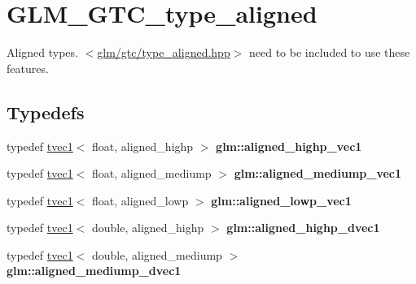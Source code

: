 \hypertarget{group__gtc__type__aligned}{}\section{G\+L\+M\+\_\+\+G\+T\+C\+\_\+type\+\_\+aligned}
\label{group__gtc__type__aligned}


Aligned types. $<$\hyperlink{gtc_2type__aligned_8hpp}{glm/gtc/type\+\_\+aligned.\+hpp}$>$ need to be included to use these features.  


\subsection*{Typedefs}
\begin{DoxyCompactItemize}
\item 
\mbox{\label{group__gtc__type__aligned_ga5d83af334bd222c85f73bf37eecf4768}} 
typedef \hyperlink{structglm_1_1tvec1}{tvec1}$<$ float, aligned\+\_\+highp $>$ {\bfseries glm\+::aligned\+\_\+highp\+\_\+vec1}
\item 
\mbox{\label{group__gtc__type__aligned_ga5fbb1e478f8f47c5809f561368572927}} 
typedef \hyperlink{structglm_1_1tvec1}{tvec1}$<$ float, aligned\+\_\+mediump $>$ {\bfseries glm\+::aligned\+\_\+mediump\+\_\+vec1}
\item 
\mbox{\label{group__gtc__type__aligned_ga9f8de0030682199a8dbef56b0f3fb3ca}} 
typedef \hyperlink{structglm_1_1tvec1}{tvec1}$<$ float, aligned\+\_\+lowp $>$ {\bfseries glm\+::aligned\+\_\+lowp\+\_\+vec1}
\item 
\mbox{\label{group__gtc__type__aligned_ga14f56809d9577d7f1c3c8fc77651c671}} 
typedef \hyperlink{structglm_1_1tvec1}{tvec1}$<$ double, aligned\+\_\+highp $>$ {\bfseries glm\+::aligned\+\_\+highp\+\_\+dvec1}
\item 
\mbox{\label{group__gtc__type__aligned_gab12565fd290bac410edac30213fef31e}} 
typedef \hyperlink{structglm_1_1tvec1}{tvec1}$<$ double, aligned\+\_\+mediump $>$ {\bfseries glm\+::aligned\+\_\+mediump\+\_\+dvec1}
\item 
\mbox{\label{group__gtc__type__aligned_gace9ca6ecc2dc6fe5891bb6d15bf3b317}} 

\end{DoxyCompactItemize}
